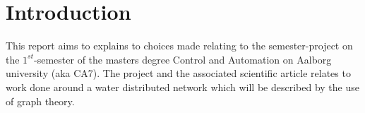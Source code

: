 \section{Introduction}
This report aims to explains to choices made relating to the semester-project on the $1^{st}$-semester of the masters degree Control and Automation on Aalborg university (aka CA7). The project and the associated scientific article relates to work done around a water distributed network which will be described by the use of graph theory.